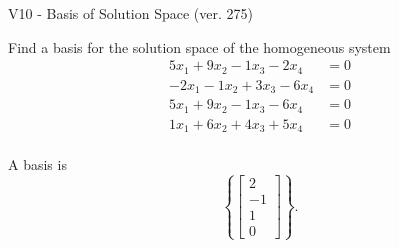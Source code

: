 \begin{exercise}
  \begin{exerciseTitle}V10 - Basis of Solution Space (ver. 275)\end{exerciseTitle}
  \begin{exerciseStatement}
    Find a basis for the solution space of the homogeneous system 
\begin{align*}
 5 x_ 1 + 9 x_ 2 -1 x_ 3 -2 x_ 4 &= 0  \\ 
  -2 x_ 1 -1 x_ 2 + 3 x_ 3 -6 x_ 4 &= 0  \\ 
  5 x_ 1 + 9 x_ 2 -1 x_ 3 -6 x_ 4 &= 0  \\ 
  1 x_ 1 + 6 x_ 2 + 4 x_ 3 + 5 x_ 4 &= 0  \\ 
 \end{align*}


 
  \end{exerciseStatement}

  \begin{exerciseAnswer}
   A basis is   
\[\left\{\left[\begin{array}{c}
2 \\
-1 \\
1 \\
0
\end{array}\right]\right\}.\]

  


  \end{exerciseAnswer}
\end{exercise}